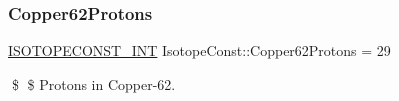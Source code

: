 \subsubsection{\texorpdfstring{Copper62\+Protons}{Copper62Protons}}
{\footnotesize\ttfamily \mbox{\hyperlink{group___isotope_const-_macros_ga5f18360b3e99483a35c32d789e62621c}{I\+S\+O\+T\+O\+P\+E\+C\+O\+N\+S\+T\+\_\+\+I\+NT}} Isotope\+Const\+::\+Copper62\+Protons = 29}

\$ \$ Protons in Copper-\/62. 
